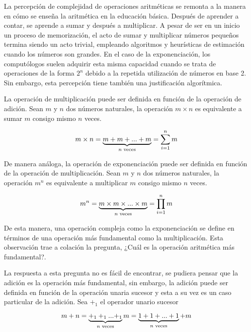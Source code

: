 La percepción de complejidad de operaciones aritméticas se remonta a la manera en cómo se enseña la aritmética en la educación básica. Después de aprender a contar, se aprende a sumar y después a multiplicar. A pesar de ser en un inicio un proceso de memorización, el acto de sumar y multiplicar números pequeños termina siendo un acto trivial, empleando algoritmos y heurísticas de estimación cuando los números son grandes. En el caso de la exponenciación, los computólogos suelen adquirir esta misma capacidad cuando se trata de operaciones de la forma \( 2^{n} \) debido a la repetida utilización de números en base 2. Sin embargo, esta percepción tiene también una justificación algorítmica.

La operación de multiplicación puede ser definida en función de la operación de adición. Sean \( m \) y \( n \) dos números naturales, la operación \( m \times n \) es equivalente a sumar \( m \) consigo mismo \( n \) veces.

\begin{equation}
  \label{eq:numeral:muldef}
  m \times n = \underbrace{m + m + ... + m}_\text{\( n \) veces} = \sum_{i=1}^{n} m
\end{equation}

De manera análoga, la operación de exponenciación puede ser definida en función de la operación de multiplicación. Sean \( m \) y \( n \) dos números naturales, la operación \( m^{n} \) es equivalente a multiplicar \( m \) consigo mismo \( n \) veces.


\begin{equation}
  \label{eq:numeral:expdef}
  m^{n} = \underbrace{m \times m \times ... \times m}_\text{\( n \) veces} = \prod_{i=1}^{n} m
\end{equation}

De esta manera, una operación compleja como la exponenciación se define en términos de una operación más fundamental como la multiplicación. Esta observación trae a colación la pregunta, ¿Cuál es la operación aritmética más fundamental?.

La respuesta a esta pregunta no es fácil de encontrar, se pudiera pensar que la adición es la operación más fundamental, sin embargo, la adición puede ser definida en función de la operación unaria sucesor y esta a su vez es un caso particular de la adición. Sea \( +_{1} \) el operador unario sucesor

\[ m + n = \underbrace{+_{1} +_{1} ... {} +_{1}}_\text{\( n \) veces} m = \underbrace{1 + 1 + ... + 1}_\text{\( n \) veces}+m \]


